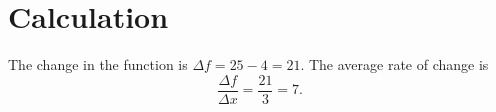 \section{Calculation}
The change in the function is $\Delta f=25-4=21$.
The average rate of change is
\[\frac{\Delta f}{\Delta x}=\frac{21}{3}=7.\]
